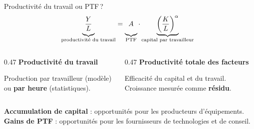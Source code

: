 \documentclass[aspectratio=169]{beamer}
\begin{document}
\begin{frame}[t]{Productivité du travail ou PTF\,?}
   \small
   \begin{equation*}
      \underbrace{\vphantom{\left(\frac{K}{L}\right)^{\alpha}}\frac{Y}{L}}_{\text{productivité du travail}} = \underbrace{\vphantom{\left(\frac{K}{L}\right)^{\alpha}}A}_{\text{PTF}} \cdot \underbrace{\left(\frac{K}{L}\right)^{\alpha}}_{\text{capital par travailleur}}
   \end{equation*}
   \vspace{0.1cm}
   \begin{columns}[T,onlytextwidth]
      \begin{column}{0.47\textwidth}
         \small\RaggedRight
         {\color{HECnavy}\bfseries Productivité du travail}\par\medskip
         Production par travailleur (modèle)\\ ou \textbf{par heure} (statistiques).
      \end{column}
      \begin{column}{0.47\textwidth}
         \small\RaggedRight
         {\color{HECgreen}\bfseries Productivité totale des facteurs}\par\medskip
         Efficacité du capital et du travail.\\ Croissance mesurée comme \textbf{résidu}.
      \end{column}
   \end{columns}
   \vspace{0.1cm}
   \begin{bizimplication}
      \small\RaggedRight \textbf{Accumulation de capital} : opportunités pour les producteurs d'équipements.\\[0.1cm] \textbf{Gains de PTF} : opportunités pour les fournisseurs de technologies et de conseil.
   \end{bizimplication}
\end{frame}
\end{document}
